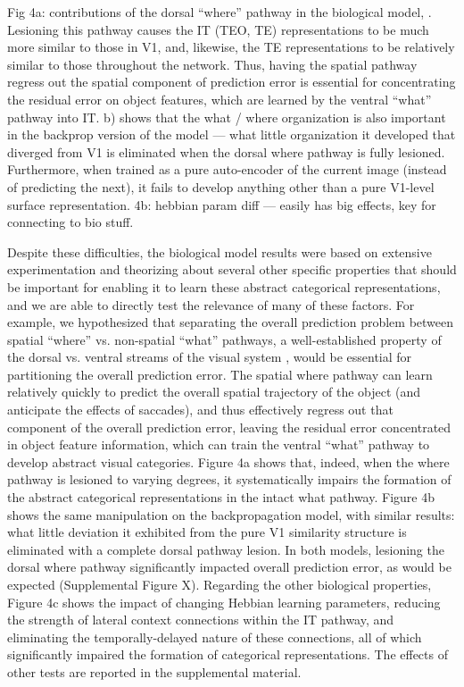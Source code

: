 \documentclass[11pt,twoside]{article}
\newif\myifpdf
\begin{document}
Fig 4a: contributions of the dorsal “where” pathway in the biological model, .  Lesioning this pathway causes the IT (TEO, TE) representations to be much more similar to those in V1, and, likewise, the TE representations to be relatively similar to those throughout the network.  Thus, having the spatial pathway regress out the spatial component of prediction error is essential for concentrating the residual error on object features, which are learned by the ventral “what” pathway into IT.  b) shows that the what / where organization is also important in the backprop version of the model — what little organization it developed that diverged from V1 is eliminated when the dorsal where pathway is fully lesioned.  Furthermore, when trained as a pure auto-encoder of the current image (instead of predicting the next), it fails to develop anything other than a pure V1-level surface representation.
4b: hebbian param diff — easily has big effects, key for connecting to bio stuff.

Despite these difficulties, the biological model results were based on extensive experimentation and theorizing about several other specific properties that should be important for enabling it to learn these abstract categorical representations, and we are able to directly test the relevance of many of these factors.  For example, we hypothesized that separating the overall prediction problem between spatial ``where'' vs. non-spatial ``what'' pathways, a well-established property of the dorsal vs. ventral streams of the visual system \cite{UngerleiderMishkin82}, would be essential for partitioning the overall prediction error.  The spatial where pathway can learn relatively quickly to predict the overall spatial trajectory of the object (and anticipate the effects of saccades), and thus effectively regress out that component of the overall prediction error, leaving the residual error concentrated in object feature information, which can train the ventral “what” pathway to develop abstract visual categories.  Figure 4a shows that, indeed, when the where pathway is lesioned to varying degrees, it systematically impairs the formation of the abstract categorical representations in the intact what pathway.  Figure 4b shows the same manipulation on the backpropagation model, with similar results: what little deviation it exhibited from the pure V1 similarity structure is eliminated with a complete dorsal pathway lesion.  In both models, lesioning the dorsal where pathway significantly impacted overall prediction error, as would be expected (Supplemental Figure X).  Regarding the other biological properties, Figure 4c shows the impact of changing Hebbian learning parameters, reducing the strength of lateral context connections within the IT pathway, and eliminating the temporally-delayed nature of these connections, all of which significantly impaired the formation of categorical representations.  The effects of other tests are reported in the supplemental material.
\end{document}
